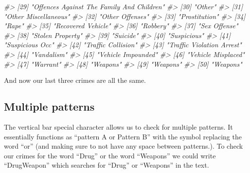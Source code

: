 \documentclass[
]{krantz}
\makeatletter
\newenvironment{Shaded}{\begin{snugshade}}{\end{snugshade}}
\newcommand{\CommentTok}[1]{\textcolor[rgb]{0.37,0.37,0.37}{\textit{#1}}}
\newenvironment{kframe}{%
\medskip{}
\setlength{\fboxsep}{.8em}
 \def\at@end@of@kframe{}%
 \ifinner\ifhmode%
  \def\at@end@of@kframe{\end{minipage}}%
  \begin{minipage}{\columnwidth}%
 \fi\fi%
 \def\FrameCommand##1{\hskip\@totalleftmargin \hskip-\fboxsep
 \colorbox{shadecolor}{##1}\hskip-\fboxsep
     \hskip-\linewidth \hskip-\@totalleftmargin \hskip\columnwidth}%
 \MakeFramed {\advance\hsize-\width
   \@totalleftmargin\z@ \linewidth\hsize
   \@setminipage}}%
 {\par\unskip\endMakeFramed%
 \at@end@of@kframe}
\renewenvironment{Shaded}{\begin{kframe}}{\end{kframe}}
\makeatother
\begin{document}
\begin{Shaded}
\begin{Highlighting}[]
\CommentTok{\#\textgreater{} [29] "Offences Against The Family And Children"  }
\CommentTok{\#\textgreater{} [30] "Other"                                     }
\CommentTok{\#\textgreater{} [31] "Other Miscellaneous"                       }
\CommentTok{\#\textgreater{} [32] "Other Offenses"                            }
\CommentTok{\#\textgreater{} [33] "Prostitution"                              }
\CommentTok{\#\textgreater{} [34] "Rape"                                      }
\CommentTok{\#\textgreater{} [35] "Recovered Vehicle"                         }
\CommentTok{\#\textgreater{} [36] "Robbery"                                   }
\CommentTok{\#\textgreater{} [37] "Sex Offense"                               }
\CommentTok{\#\textgreater{} [38] "Stolen Property"                           }
\CommentTok{\#\textgreater{} [39] "Suicide"                                   }
\CommentTok{\#\textgreater{} [40] "Suspicious"                                }
\CommentTok{\#\textgreater{} [41] "Suspicious Occ"                            }
\CommentTok{\#\textgreater{} [42] "Traffic Collision"                         }
\CommentTok{\#\textgreater{} [43] "Traffic Violation Arrest"                  }
\CommentTok{\#\textgreater{} [44] "Vandalism"                                 }
\CommentTok{\#\textgreater{} [45] "Vehicle Impounded"                         }
\CommentTok{\#\textgreater{} [46] "Vehicle Misplaced"                         }
\CommentTok{\#\textgreater{} [47] "Warrant"                                   }
\CommentTok{\#\textgreater{} [48] "Weapons"                                   }
\CommentTok{\#\textgreater{} [49] "Weapons"                                   }
\CommentTok{\#\textgreater{} [50] "Weapons"}
\end{Highlighting}
\end{Shaded}

And now our last three crimes are all the same.

\hypertarget{multiple-patterns}{%
\subsection{\texorpdfstring{Multiple patterns
\texttt{\textbar{}}}{Multiple patterns \textbar{}}}\label{multiple-patterns}}

The vertical bar \texttt{\textbar{}} special character
allows us to check for multiple patterns. It essentially
functions as ``pattern A or Pattern B'' with the
\texttt{\textbar{}} symbol replacing the word ``or'' (and
making sure to not have any space between patterns.). To
check our crimes for the word ``Drug'' or the word
``Weapons'' we could write ``Drug\textbar Weapon'' which
searches for ``Drug'' or ``Weapons'' in the text.
\end{document}
